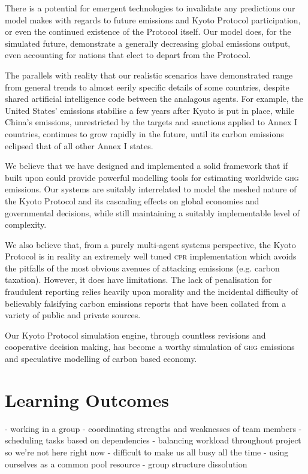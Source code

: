 There is a potential for emergent technologies to invalidate any predictions our model makes with regards to future emissions and Kyoto Protocol participation, or even the continued existence of the Protocol itself. Our model does, for the simulated future, demonstrate a generally decreasing global emissions output, even accounting for nations that elect to depart from the Protocol.

The parallels with reality that our realistic scenarios have demonstrated range from general trends to almost eerily specific details of some countries, despite shared artificial intelligence code between the analagous agents. For example, the United States' emissions stabilise a few years after Kyoto is put in place, while China's emissions, unrestricted by the targets and sanctions applied to Annex I countries, continues to grow rapidly in the future, until its carbon emissions eclipsed that of all other Annex I states.

We believe that we have designed and implemented a solid framework that if built upon could provide powerful modelling tools for estimating worldwide \textsc{ghg} emissions. Our systems are suitably interrelated to model the meshed nature of the Kyoto Protocol and its cascading effects on global economies and governmental decisions, while still maintaining a suitably implementable level of complexity.

We also believe that, from a purely multi-agent systems perspective, the Kyoto Protocol is in reality an extremely well tuned \textsc{cpr} implementation which avoids the pitfalls of the most obvious avenues of attacking \CO emissions (e.g. carbon taxation). However, it does have limitations. The lack of penalisation for fraudulent reporting relies heavily upon morality and the incidental difficulty of believably falsifying carbon emissions reports that have been collated from a variety of public and private sources.

Our Kyoto Protocol simulation engine, through countless revisions and cooperative decision making, has become a worthy simulation of \textsc{ghg} emissions and speculative modelling of carbon based economy.

\section{Learning Outcomes}

- working in a group
- coordinating strengths and weaknesses of team members
- scheduling tasks based on dependencies
- balancing workload throughout project so we're not here right now
- difficult to make us all busy all the time
- using ourselves as a common pool resource
- group structure dissolution

